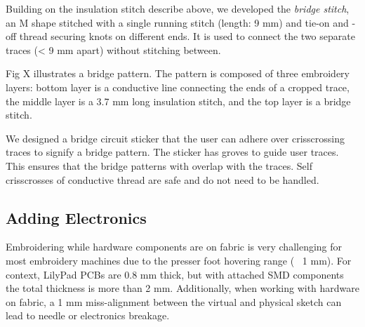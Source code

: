 \documentclass[header.tex]{subfiles}
\begin{document}
Building on the insulation stitch describe above, we developed the \textit{bridge stitch}, an M shape stitched with a single running stitch (length: 9 mm) and tie-on and -off thread securing knots on different ends. It is used to connect the two separate traces (< 9 mm apart) without stitching between.

Fig X illustrates a bridge pattern. The pattern is composed of three embroidery layers: bottom layer is a conductive line connecting the ends of a cropped trace, the middle layer is a 3.7 mm long insulation stitch, and the top layer is a bridge stitch.

We designed a bridge circuit sticker that the user can adhere over crisscrossing traces to signify a bridge pattern. The sticker has groves to guide user traces. This ensures that the bridge patterns with overlap with the traces. Self crisscrosses of conductive thread are safe and do not need to be handled.



\subsection{Adding Electronics}
Embroidering while hardware components are on fabric is very challenging for most embroidery machines due to the presser foot hovering range (~ 1 mm). For context, LilyPad PCBs are 0.8 mm thick, but with attached SMD components the total thickness is more than 2 mm. Additionally, when working with hardware on fabric, a 1 mm miss-alignment between the virtual and physical sketch can lead to needle or electronics breakage. 
\end{document}
